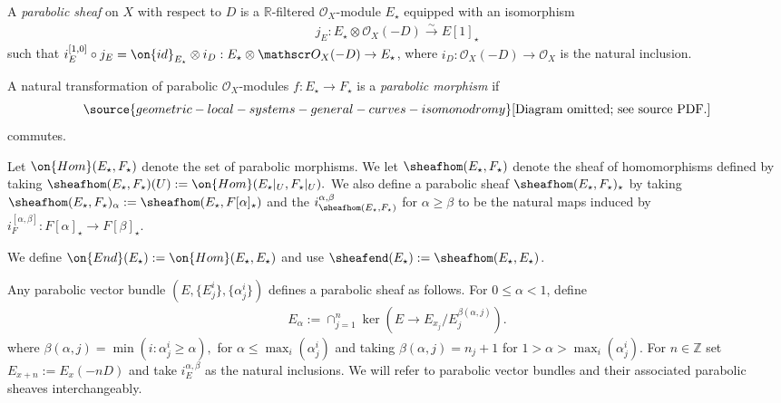 \begin{definition}
\notready
	\label{definition:parabolic-sheaf}
A {\em parabolic sheaf} on $X$ with respect to $D$ is
a $\mathbb R$-filtered $\mathscr O_X$-module $E_\star$ equipped with an isomorphism
\begin{align*}
	j_E : E_\star \otimes \mathscr O_X(-D) \overset{\sim}{\to} E[1]_\star
\end{align*}
 such that $i_E^{[1,0]} \circ j_E = \on{id}_{E_\star}
\otimes i_D: E_\star \otimes \mathscr O_X(-D) \to E_\star$, where $i_D: \mathscr{O}_X(-D)\to \mathscr{O}_X$ is the natural inclusion.

A natural transformation of parabolic $\mathscr O_X$-modules $f: E_\star \to
F_\star$ is a {\em parabolic morphism} if
\begin{equation}
	\label{equation:}
\source{geometric-local-systems-general-curves-isomonodromy}
	\text{[Diagram omitted; see source PDF.]}\end{equation}
commutes.

Let $\on{Hom}(E_\star, F_\star)$ denote the set of parabolic morphisms.
We let $\sheafhom(E_\star, F_\star)$ denote the sheaf of homomorphisms
defined by taking $\sheafhom(E_\star, F_\star)(U):= \on{Hom}(E_\star|_U,
F_\star|_U).$
We also define a parabolic sheaf
$\sheafhom(E_\star, F_\star)_\star$ by taking
$\sheafhom(E_\star, F_\star)_\alpha := \sheafhom(E_\star, F[\alpha]_\star)$
and the $i_{\sheafhom(E_\star, F_\star)}^{\alpha,\beta}$ for $\alpha \geq \beta$
to be the natural maps
induced by $i_F^{[\alpha, \beta]}: F[\alpha]_\star \to F[\beta]_\star$.

We define $\on{End}(E_\star) := \on{Hom}(E_\star, E_\star)$
and use $\sheafend(E_\star) := \sheafhom(E_\star, E_\star)$.
\end{definition}



\begin{example}
\notready
	\label{example:parabolic}
	Any parabolic vector bundle $(E, \{E^i_j\}, \{\alpha^i_j\})$ defines a
	parabolic sheaf as follows. For $0 \leq \alpha < 1$,
	define
	\begin{align*}
	E_\alpha := \cap_{j=1}^n \ker(E \to
	E_{x_j}/E^{\beta(\alpha, j)}_j).
	\end{align*}
	where $\beta(\alpha, j)=\min(i: \alpha^i_j\geq \alpha),$ for $\alpha\leq \max_i(\alpha^i_j)$ and taking $\beta(\alpha, j)=n_j+1$ for $1>\alpha>\max_i(\alpha^i_j)$.
	For $n\in \mathbb{Z}$ set $E_{x+n} := E_x(-nD)$ and take $i^{\alpha,\beta}_E$ as the
	natural inclusions. We will refer to parabolic vector bundles and their associated parabolic sheaves interchangeably.
\end{example}

